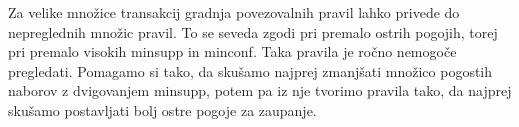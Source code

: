 Za velike množice transakcij gradnja povezovalnih pravil lahko privede do nepreglednih množic pravil. To se seveda zgodi pri premalo ostrih pogojih, torej pri premalo visokih minsupp in minconf. Taka pravila je ročno nemogoče pregledati. Pomagamo si tako, da skušamo najprej zmanjšati množico pogostih naborov z dvigovanjem minsupp, potem pa iz nje tvorimo pravila tako, da najprej skušamo postavljati bolj ostre pogoje za zaupanje. 
